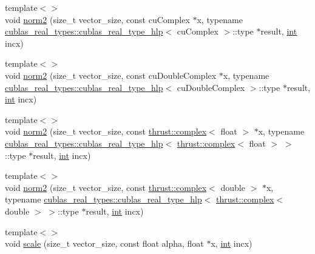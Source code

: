 \begin{DoxyCompactItemize}
\item 
{\footnotesize template$<$$>$ }\\void \hyperlink{classcublas__wrap_a0b7c1d6bbd53b3b918b567e9c5ab1c21}{norm2} (size\-\_\-t vector\-\_\-size, const cu\-Complex $\ast$x, typename \hyperlink{structcublas__real__types_1_1cublas__real__type__hlp}{cublas\-\_\-real\-\_\-types\-::cublas\-\_\-real\-\_\-type\-\_\-hlp}$<$ cu\-Complex $>$\-::type $\ast$result, \hyperlink{classint}{int} incx)
\item 
{\footnotesize template$<$$>$ }\\void \hyperlink{classcublas__wrap_aa2460f80a7e67a8c6f3166afab5f0002}{norm2} (size\-\_\-t vector\-\_\-size, const cu\-Double\-Complex $\ast$x, typename \hyperlink{structcublas__real__types_1_1cublas__real__type__hlp}{cublas\-\_\-real\-\_\-types\-::cublas\-\_\-real\-\_\-type\-\_\-hlp}$<$ cu\-Double\-Complex $>$\-::type $\ast$result, \hyperlink{classint}{int} incx)
\item 
{\footnotesize template$<$$>$ }\\void \hyperlink{classcublas__wrap_aecdaa224fb755856bff23a622a797478}{norm2} (size\-\_\-t vector\-\_\-size, const \hyperlink{test__deflation__typedefs_8h_a25cabcac5deb559feab415e2c445d8ba}{thrust\-::complex}$<$ float $>$ $\ast$x, typename \hyperlink{structcublas__real__types_1_1cublas__real__type__hlp}{cublas\-\_\-real\-\_\-types\-::cublas\-\_\-real\-\_\-type\-\_\-hlp}$<$ \hyperlink{test__deflation__typedefs_8h_a25cabcac5deb559feab415e2c445d8ba}{thrust\-::complex}$<$ float $>$ $>$\-::type $\ast$result, \hyperlink{classint}{int} incx)
\item 
{\footnotesize template$<$$>$ }\\void \hyperlink{classcublas__wrap_a2832b5417990dbe651d4cfc2184b6b21}{norm2} (size\-\_\-t vector\-\_\-size, const \hyperlink{test__deflation__typedefs_8h_a25cabcac5deb559feab415e2c445d8ba}{thrust\-::complex}$<$ double $>$ $\ast$x, typename \hyperlink{structcublas__real__types_1_1cublas__real__type__hlp}{cublas\-\_\-real\-\_\-types\-::cublas\-\_\-real\-\_\-type\-\_\-hlp}$<$ \hyperlink{test__deflation__typedefs_8h_a25cabcac5deb559feab415e2c445d8ba}{thrust\-::complex}$<$ double $>$ $>$\-::type $\ast$result, \hyperlink{classint}{int} incx)
\item 
{\footnotesize template$<$$>$ }\\void \hyperlink{classcublas__wrap_ae4a4ec644bdd2cf0e113e1d4b55a5e19}{scale} (size\-\_\-t vector\-\_\-size, const float alpha, float $\ast$x, \hyperlink{classint}{int} incx)
\item 

\end{DoxyCompactItemize}
